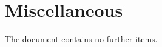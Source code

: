 \documentclass{article}
\begin{document}

\section{Miscellaneous}
The document contains no further items.
\end{document}
